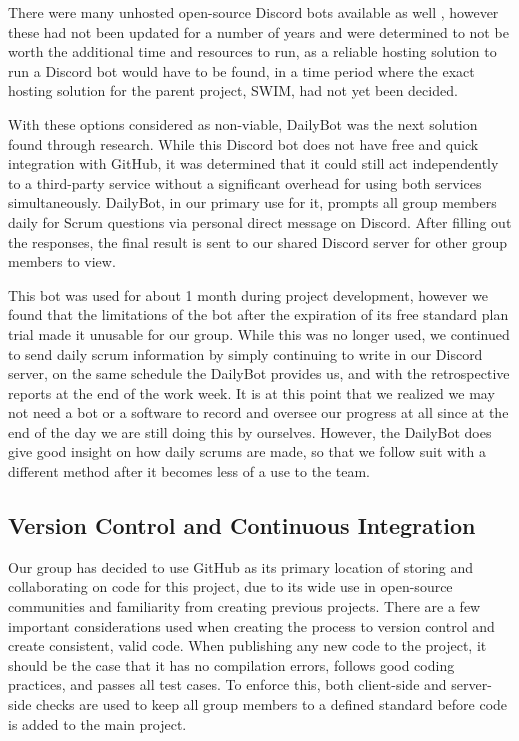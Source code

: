 \documentclass[
    paper=letter,
    parskip=half,
    fontsize=12pt,
    titlepage=firstiscover,
    toc=bibliography,
    numbers=endperiod
]{scrartcl}
\begin{document}
There were many unhosted open-source Discord bots available as well \cite{austen-scrum-bot, navn-standup-bot, fijter-standup-bot, vivek-scrum-bot}, however these had not been updated for a number of
years and were determined to not be worth the additional time and
resources to run, as a reliable hosting solution to run a Discord bot
would have to be found, in a time period where the exact hosting
solution for the parent project, SWIM, had not yet been decided.

With these options considered as non-viable, DailyBot \cite{dailybot} was the next
solution found through research. While this Discord bot does not have
free and quick integration with GitHub, it was determined that it could
still act independently to a third-party service without a significant
overhead for using both services simultaneously. DailyBot, in our
primary use for it, prompts all group members daily for Scrum questions
via personal direct message on Discord. After filling out the responses,
the final result is sent to our shared Discord server for other group
members to view.

This bot was used for about 1 month during project development, however
we found that the limitations of the bot after the expiration of its
free standard plan trial made it unusable for our group. While this was
no longer used, we continued to send daily scrum information by simply
continuing to write in our Discord server, on the same schedule the
DailyBot provides us, and with the retrospective reports at the end of
the work week. It is at this point that we realized we may not need a
bot or a software to record and oversee our progress at all since at the
end of the day we are still doing this by ourselves. However, the
DailyBot does give good insight on how daily scrums are made, so that we
follow suit with a different method after it becomes less of a use to
the team.

\subsection{Version Control and Continuous Integration}
\label{subsec:version-control-and-ci}

Our group has decided to use GitHub as its primary location of storing
and collaborating on code for this project, due to its wide use in
open-source communities and familiarity from creating previous projects.
There are a few important considerations used when creating the process
to version control and create consistent, valid code. When publishing
any new code to the project, it should be the case that it has no
compilation errors, follows good coding practices, and passes all test
cases. To enforce this, both client-side and server-side checks are used
to keep all group members to a defined standard before code is added to
the main project.
\end{document}
